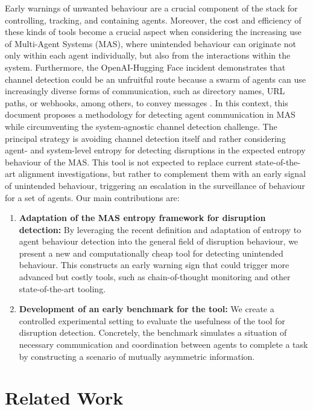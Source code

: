 \documentclass[11pt,letterpaper]{article}
\begin{document}
Early warnings of unwanted behaviour are a crucial component of the stack for controlling, tracking, and containing agents. Moreover, the cost and efficiency of these kinds of tools become a crucial aspect when considering the increasing use of Multi-Agent Systems (MAS), where unintended behaviour can originate not only within each agent individually, but also from the interactions within the system. Furthermore, the OpenAI-Hugging Face incident demonstrates that channel detection could be an unfruitful route because a swarm of agents can use increasingly diverse forms of communication, such as directory names, URL paths, or webhooks, among others, to convey messages \citep{openai2026incident}. In this context, this document proposes a methodology for detecting agent communication in MAS while circumventing the system-agnostic channel detection challenge. The principal strategy is avoiding channel detection itself and rather considering agent- and system-level entropy for detecting disruptions in the expected entropy behaviour of the MAS. This tool is not expected to replace current state-of-the-art alignment investigations, but rather to complement them with an early signal of unintended behaviour, triggering an escalation in the surveillance of behaviour for a set of agents. Our main contributions are:

\begin{enumerate}
\item \textbf{Adaptation of the MAS entropy framework for disruption detection:} By leveraging the recent definition and adaptation of entropy to agent behaviour detection \citep{zhao2026doesmultiagentcollaborationhelp, shannon_hallucination} into the general field of disruption behaviour, we present a new and computationally cheap tool for detecting unintended behaviour. This constructs an early warning sign that could trigger more advanced but costly tools, such as chain-of-thought monitoring and other state-of-the-art tooling.
\item \textbf{Development of an early benchmark for the tool:} We create a controlled experimental setting to evaluate the usefulness of the tool for disruption detection. Concretely, the benchmark simulates a situation of necessary communication and coordination between agents to complete a task by constructing a scenario of mutually asymmetric information.
\end{enumerate}

\section{Related Work}
\end{document}
